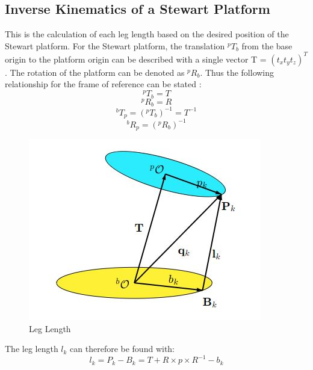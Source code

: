 \subsection{Inverse Kinematics of a Stewart Platform}
This is the calculation of each leg length based on the desired position of the Stewart platform. 
For the Stewart platform, the translation $^{p}T_{b}$ from the base origin to the platform origin can be described with a single vector T = $(t_{x} t_{y} t_{z})^{T} $. The rotation of the platform can be denoted as $^{p}R_{b}$. Thus the following relationship for the frame of reference can be stated \cite{Eisele_2019}:
$$^{p}T_{b} = T$$
	$$^{p}R_{b} = R$$
	$$^{b}T_{p} =(^{p}T_{b})^{-1} =T^{-1}$$
	$$^{b}R_{p} = (^{p}R_{b})^{-1} $$
\begin{center}
	\begin{figure}[!h]
	\centering
	\includegraphics[width=0.4\linewidth]{Figures/servo2}
	\caption[Leg length]{Leg Length \cite{Eisele_2019}}
	\end{figure}
\end{center}
The leg length $l_{k}$ can therefore be found with:
\begin{equation}
l_{k} = P_{k} - B_{k} = T + R \times p \times R^{-1} - b_{k}
\end{equation}
